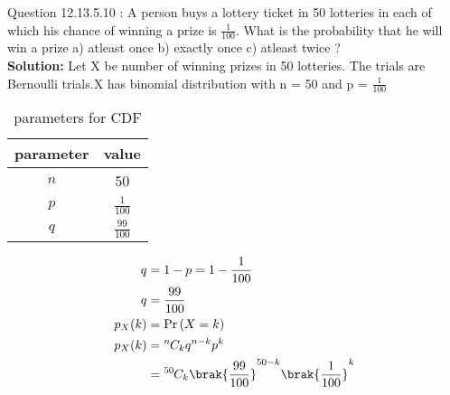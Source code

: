 \documentclass[journal,12pt,twocolumn]{IEEEtran}
\theoremstyle{remark}
\begin{document}
\newcommand{\solution}{\noindent \textbf{Solution: }}
\newcommand{\cosec}{\,\text{cosec}\,}
\providecommand{\dec}[2]{\ensuremath{\overset{#1}{\underset{#2}{\gtrless}}}}
\newcommand{\myvec}[1]{\ensuremath{\begin{pmatrix}#1\end{pmatrix}}}
\newcommand{\mydet}[1]{\ensuremath{\begin{vmatrix}#1\end{vmatrix}}}
\newcommand{\myaugvec}[2]{\ensuremath{\begin{amatrix}{#1}#2\end{amatrix}}}
\providecommand{\rank}{\text{rank}}
\providecommand{\pr}[1]{\ensuremath{\Pr\left(#1\right)}}
\providecommand{\qfunc}[1]{\ensuremath{Q\left(#1\right)}}
	\newcommand*{\permcomb}[4][0mu]{{{}^{#3}\mkern#1#2_{#4}}}
\newcommand*{\perm}[1][-3mu]{\permcomb[#1]{P}}
\newcommand*{\comb}[1][-1mu]{\permcomb[#1]{C}}
\providecommand{\qfunc}[1]{\ensuremath{Q\left(#1\right)}}
\providecommand{\gauss}[2]{\mathcal{N}\ensuremath{\left(#1,#2\right)}}
\providecommand{\diff}[2]{\ensuremath{\frac{d{#1}}{d{#2}}}}
\providecommand{\myceil}[1]{\left \lceil #1 \right \rceil }
\newcommand\figref{Fig.~\ref}
\newcommand\tabref{Table~\ref}
\newcommand{\sinc}{\,\text{sinc}\,}
\newcommand{\rect}{\,\text{rect}\,}
\let\vec\mathbf
Question 12.13.5.10 :  A person buys a lottery ticket in 50 lotteries in each of which his chance of winning a prize is $\frac{1}{100}$. What is the probability that he will win a prize a) atleast once b) exactly once c) atleast twice ?\\
\solution Let X be number of winning prizes in 50 lotteries. The trials are Bernoulli trials.X has binomial distribution with n = 50 and p = $\frac{1}{100}$ 
\begin{table}[h]
\centering
\caption{parameters for CDF}
\label{table.2:ncert/12/13/5/10/}
\begin{tabular}{|c|c|}
\hline
parameter & value\\
\hline
$n$ & 50\\
\hline
$p$ & $\frac{1}{100}$\\
\hline
$q$ & $\frac{99}{100}$\\
\hline
\end{tabular}
\end{table}
\begin{align}
q &= 1 - p = 1-\frac{1}{100} \\
q &=   \frac{99}{100} \\
p_X(k) &= \pr{X=k} \\
p_X(k) &= \comb{n}{k} q^{n-k}p^{k} \\
        &= \comb{50}{k}\brak{\frac{99}{100}}^{50-k}\brak{\frac{1}{100}}^{k} 
\end{align} 
\end{document}
